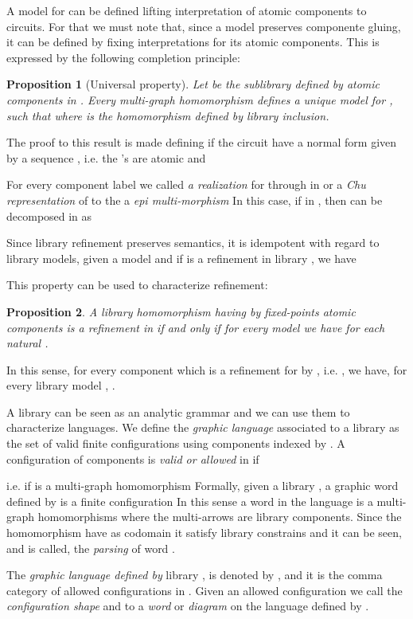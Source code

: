 \documentclass[oribibl]{llncs}
\newtheorem{prop}{Proposition}
\begin{document}
A model for  can be defined lifting interpretation of atomic components to circuits. For that we must note that, since a model preserves componente gluing, it can be defined by fixing interpretations for its atomic components. This is expressed by the following completion principle:

\begin{prop}[Universal property]
Let  be the sublibrary defined by atomic components in . Every multi-graph homomorphism  defines a unique model  for , such that  where  is the homomorphism defined by library inclusion.
\end{prop}

The proof to this result is made defining  if the circuit  have a normal form given by a sequence
, i.e. the 's are atomic and


For every component label  we called \emph{a realization}
for  through  in  or a \emph{Chu representation} of  to the a \emph{epi multi-morphism}  In this case, if  in , then  can be decomposed in 
as


Since library refinement preserves semantics, it is idempotent with regard to library models, given a model  and if  is a refinement in library , we have

This property can be used to characterize refinement:
\begin{prop}
A library homomorphism  having by fixed-points atomic components is a refinement in  if and only if for every model  we have
 for each natural .
\end{prop}

In this sense, for every component  which is a refinement for  by , i.e. , we have, for every library model , .



A library can be seen as an analytic grammar and we can use them to characterize languages. We define the \emph{graphic language} associated to a library  as the set of valid finite configurations using components indexed by
. A configuration of components  is \emph{valid or allowed} in  if

i.e. if  is a multi-graph homomorphism
 Formally, given a library , a graphic word  defined by  is a finite
configuration
 In this sense a word in the language is a multi-graph homomorphisms where the multi-arrows are library components. Since the homomorphism  have  as codomain it satisfy library constrains and it can be seen, and is called, the \emph{parsing} of word .

The \emph{graphic language defined by} library , is denoted by ,
and it is the comma category
 of allowed configurations in
. Given an allowed configuration  we call
  the \emph{configuration shape} and  to  a
\emph{word} or \emph{diagram} on the language defined by .
\end{document}

